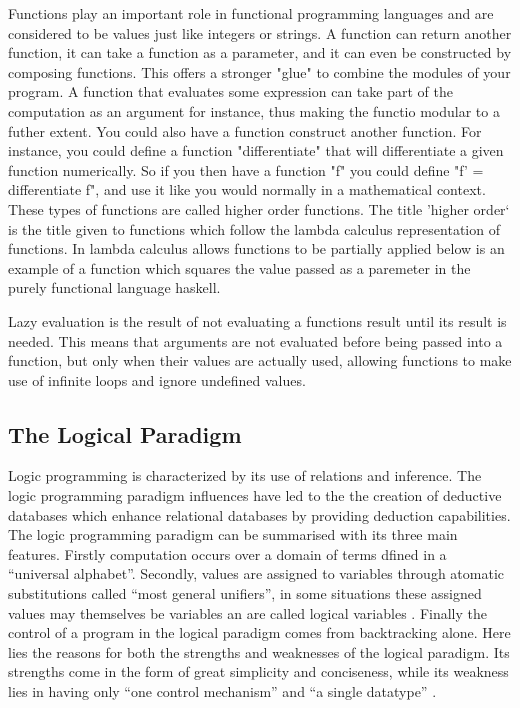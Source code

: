 \documentclass[main.tex]{subfiles}
\begin{document}
%
Functions play an important role in functional programming languages and are considered to be values just like integers or strings. A function can return another function, it can take a function as a parameter, and it can even be constructed by composing functions. This offers a stronger "glue" to combine the modules of your program. A function that evaluates some expression can take part of the computation as an argument for instance, thus making the functio modular to a futher extent.
You could also have a function construct another function. For instance, you could define a function "differentiate" that will differentiate a given function numerically. So if you then have a function "f" you could define "f' = differentiate f", and use it like you would normally in a mathematical context. These types of functions are called higher order functions.
%
The title 'higher order` is the title given to functions which follow the lambda calculus representation of functions\cite{Duame2002}. In lambda calculus allows functions to be partially applied
below is an example of a function which squares the value passed as a paremeter in the purely functional language haskell.

Lazy evaluation is the result of not evaluating a functions result until its result is needed. This means that arguments are not evaluated before being passed into a function, but only when their values are actually used, allowing functions to make use of infinite loops and ignore undefined values. 


\subsection{The Logical Paradigm} %
Logic programming is characterized by its use of relations and inference.\cite{Aaby1996} The logic programming paradigm influences have led to the the creation of deductive databases which enhance relational databases by providing deduction capabilities. The logic programming paradigm can be summarised with its three main features. Firstly computation occurs over a domain of terms dfined in a ``universal alphabet''. Secondly, values are assigned to variables through atomatic substitutions called ``most general unifiers'', in some situations these assigned values may themselves be variables an are called logical variables \cite{Apt2001}. Finally the control of a program in the logical paradigm comes from backtracking alone. Here lies the reasons for both the strengths and weaknesses of the logical paradigm. Its strengths come in the form of great simplicity and conciseness, while its weakness lies in having only ``one control mechanism'' and ``a single datatype'' \cite{Apt2001}.
\end{document}

